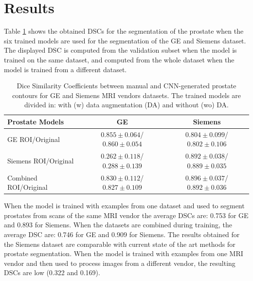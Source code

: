 \section{Results}

Table \ref{tab:res_prost} shows the obtained DSCs for the segmentation of the prostate when the six trained models are used for the segmentation of the GE and Siemens dataset.  The displayed DSC is computed from the validation subset when the model is trained on the same dataset, and computed from the whole dataset when the model is trained from a different dataset. 
 \begin{table}[h]
    \label{tab:res_prost}
    \caption{Dice Similarity Coefficients between manual and CNN-generated prostate contours for GE and Siemens MRI vendors datasets. The trained models are divided in: with (w) data augmentation (DA) and without (wo) DA.}
    \begin{tabular}{lcc}
         \hline
          \textbf{Prostate Models} & \textbf{GE} & \textbf{Siemens }\\
         \hline
         GE ROI/Original & $0.855\pm0.064$/$\mathbf{0.860\pm0.054}$ & $0.804\pm0.099$/$0.802\pm0.106$ \\
         \hline
         Siemens ROI/Original & $0.262\pm0.118$/$0.288\pm0.139$ & $0.892\pm0.038$/$0.889\pm0.035$ \\
         \hline
         Combined ROI/Original & $0.830\pm0.112$/$0.827\pm0.109$ & $\mathbf{0.896\pm0.037}$/$0.892\pm0.036$\\
         \hline
    \end{tabular}
\end{table} 
When the model is trained with examples from one dataset and used to segment prostates from scans of the same MRI vendor the average DSCs are: 0.753 for GE and 0.893 for Siemens. When the datasets are combined during training, the average DSC are: 0.746 for GE and 0.909 for Siemens.  The results obtained for the Siemens dataset are comparable with current state of the art methods for prostate segmentation. When the model is trained with examples from one MRI vendor and then used to process images from a different vendor, the resulting DSCs are low (0.322 and 0.169).  %
